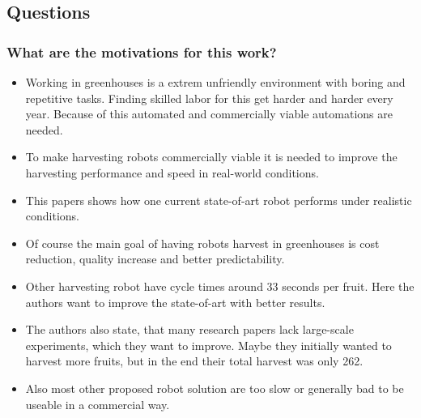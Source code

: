 \subsection*{Questions}
\subsubsection*{What are the motivations for this work?}
\begin{itemize}
    \item Working in greenhouses is a extrem unfriendly environment with boring and repetitive tasks. Finding skilled
    labor for this get harder and harder every year. Because of this automated and commercially viable automations are needed.
    \item To make harvesting robots commercially viable it is needed to improve the harvesting performance and speed in real-world conditions.
    \item This papers shows how one current state-of-art robot performs under realistic conditions.
    \item Of course the main goal of having robots harvest in greenhouses is cost reduction, quality increase and 
    better predictability.
    \item Other harvesting robot have cycle times around 33 seconds per fruit. Here the authors want to improve the state-of-art with better results.
    \item The authors also state, that many research papers lack large-scale experiments, which they want to improve. 
    Maybe they initially wanted to harvest more fruits, but in the end their total harvest was only 262.
    \item Also most other proposed robot solution are too slow or generally bad to be useable in a commercial way.
\end{itemize}
